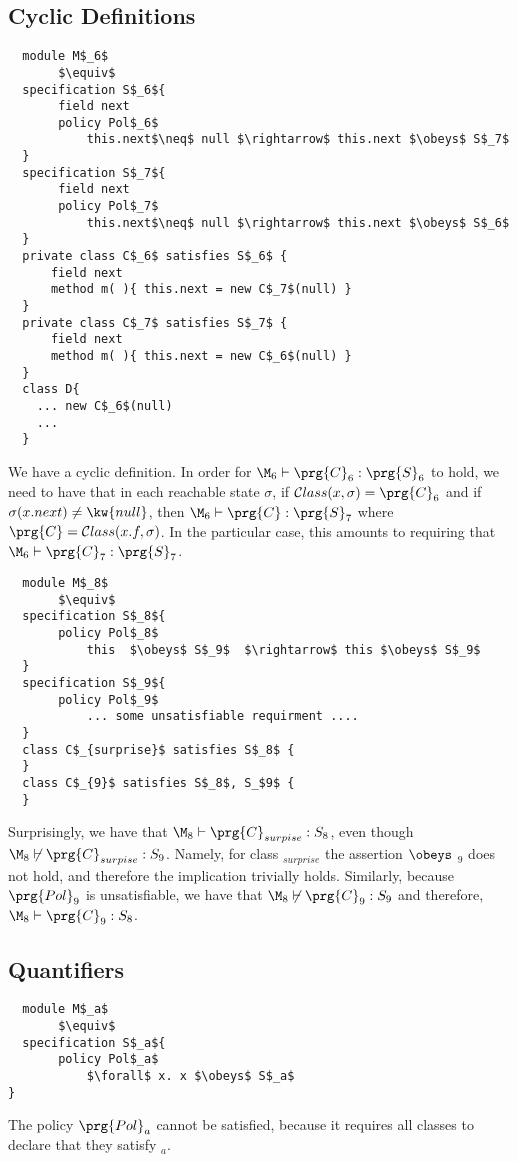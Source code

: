 \subsection{Cyclic Definitions}


 \begin{lstlisting}
  module M$_6$
       $\equiv$
  specification S$_6${
       field next
       policy Pol$_6$
           this.next$\neq$ null $\rightarrow$ this.next $\obeys$ S$_7$
  }
  specification S$_7${
       field next
       policy Pol$_7$
           this.next$\neq$ null $\rightarrow$ this.next $\obeys$ S$_6$
  }
  private class C$_6$ satisfies S$_6$ {
      field next
      method m( ){ this.next = new C$_7$(null) }
  }
  private class C$_7$ satisfies S$_7$ {
      field next
      method m( ){ this.next = new C$_6$(null) }
  }
  class D{
    ... new C$_6$(null)
    ...
  }
\end{lstlisting}

We have a cyclic definition. 
In order for $\M_6 \vdash \prg{C}_6 : \prg{S}_6$ to hold, 
we need to have that in each reachable state $\sigma$, if ${\cal C}lass (x,\sigma)=\prg{C}_6$ and if 
$\sigma(x.next)\neq {\kw{ null}}$, then 
$\M_6 \vdash \prg{C}  : \prg{S}_7$ where 
$\prg{C}={\cal C}lass (x.f,\sigma)$. In the particular case, this 
amounts to requiring that $\M_6 \vdash \prg{C}_7 : \prg{S}_7$.


 \begin{lstlisting}
  module M$_8$
       $\equiv$
  specification S$_8${
       policy Pol$_8$
           this  $\obeys$ S$_9$  $\rightarrow$ this $\obeys$ S$_9$
  }
  specification S$_9${
       policy Pol$_9$
           ... some unsatisfiable requirment ....
  }
  class C$_{surprise}$ satisfies S$_8$ {
  }
  class C$_{9}$ satisfies S$_8$, S_$9$ {
  }
\end{lstlisting}

Surprisingly, we have that  $\M_8 \vdash \prg{C}_{surpise}: S_8$, even though $\M_8 \not\vdash \prg{C}_{surpise}: S_9$. Namely,
for class $_{surprise}$ the assertion  $\obeys$ $_9$ does not hold, and therefore the implication trivially holds.
Similarly, because $\prg{Pol}_9$ is unsatisfiable, we have that $\M_8 \not\vdash \prg{C}_{9}: S_9$ and 
therefore, $\M_8 \vdash \prg{C}_{9}: S_8$. 


 
 
\subsection{Quantifiers}


 \begin{lstlisting}
  module M$_a$
       $\equiv$
  specification S$_a${
       policy Pol$_a$
           $\forall$ x. x $\obeys$ S$_a$
}
\end{lstlisting}
 The policy $\prg{Pol}_a$ cannot be satisfied, because it requires all classes to declare that they satisfy $_a$.



 

